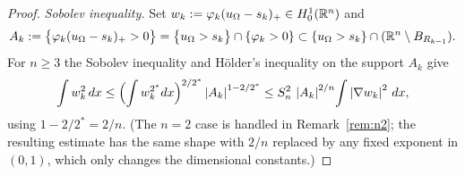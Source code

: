 \begin{proof}
\smallskip
\emph{Sobolev inequality.} Set
$w_k:=\varphi_k(u_\Omega-s_k)_+\in H^1_0(\mathbb R^n)$ and
\[
   A_k:=\bigl\{\varphi_k(u_\Omega-s_k)_+>0\bigr\}
       =\bigl\{u_\Omega>s_k\bigr\}\cap\{\varphi_k>0\}
       \subset\{u_\Omega>s_k\}\cap(\mathbb R^n\setminus B_{R_{k-1}}).
\]
For $n\ge3$ the Sobolev inequality and Hölder's inequality on the support
$A_k$ give
\begin{equation}\label{eq:sobolev}
   \int w_k^2\,dx
   \le\Bigl(\int w_k^{2^*}dx\Bigr)^{2/2^*}\left|A_k\right|^{1-2/2^*}
   \le S_n^2\,\left|A_k\right|^{2/n}\!\int\left|\nabla w_k\right|^2\,dx,
\end{equation}
using $1-2/2^*=2/n$.
(The $n=2$ case is handled in
Remark~\ref{rem:n2}; the resulting estimate has the same shape with $2/n$
replaced by any fixed exponent in $(0,1)$, which only changes the
dimensional constants.)


\end{proof}
